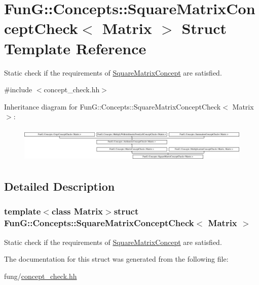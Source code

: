 \hypertarget{structFunG_1_1Concepts_1_1SquareMatrixConceptCheck}{}\section{Fun\+G\+:\+:Concepts\+:\+:Square\+Matrix\+Concept\+Check$<$ Matrix $>$ Struct Template Reference}
\label{structFunG_1_1Concepts_1_1SquareMatrixConceptCheck}


Static check if the requirements of \hyperlink{structFunG_1_1Concepts_1_1SquareMatrixConcept}{Square\+Matrix\+Concept} are satisfied.  




{\ttfamily \#include $<$concept\+\_\+check.\+hh$>$}

Inheritance diagram for Fun\+G\+:\+:Concepts\+:\+:Square\+Matrix\+Concept\+Check$<$ Matrix $>$\+:\begin{figure}[H]
\begin{center}
\leavevmode
\includegraphics[height=1.728395cm]{structFunG_1_1Concepts_1_1SquareMatrixConceptCheck}
\end{center}
\end{figure}


\subsection{Detailed Description}
\subsubsection*{template$<$class Matrix$>$struct Fun\+G\+::\+Concepts\+::\+Square\+Matrix\+Concept\+Check$<$ Matrix $>$}

Static check if the requirements of \hyperlink{structFunG_1_1Concepts_1_1SquareMatrixConcept}{Square\+Matrix\+Concept} are satisfied. 

The documentation for this struct was generated from the following file\+:\begin{DoxyCompactItemize}
\item 
fung/\hyperlink{concept__check_8hh}{concept\+\_\+check.\+hh}\end{DoxyCompactItemize}
